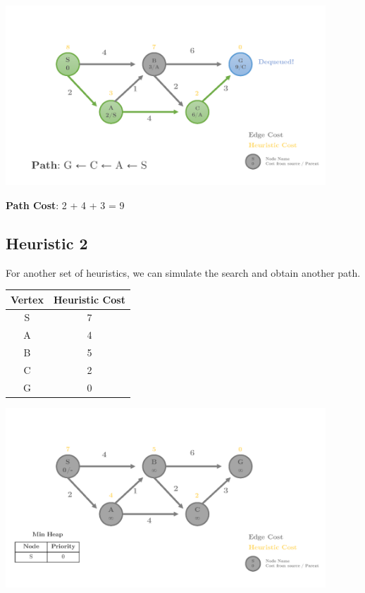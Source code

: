 \documentclass[12pt]{article}
\begin{document}
\begin{center}
  \includegraphics[width=0.9\textwidth]{heuristic1_Page6.png}
\end{center}

\noindent
\textbf{Path Cost}: 2 + 4 + 3 = 9

\pagebreak
\subsection*{Heuristic 2}

For another set of heuristics, we can simulate the search and obtain another path.


\begin{table}[h]
  \centering
  \begin{tabular}{cc}
  \toprule
  \textbf{Vertex} & \textbf{Heuristic Cost} \\
  \midrule
  S & 7 \\
  A & 4 \\
  B & 5 \\
  C & 2 \\
  G & 0 \\
  \bottomrule
  \end{tabular}
\end{table}

\begin{center}
  \includegraphics[width=0.9\textwidth]{heuristic2_Page1.png}
\end{center}
\end{document}
